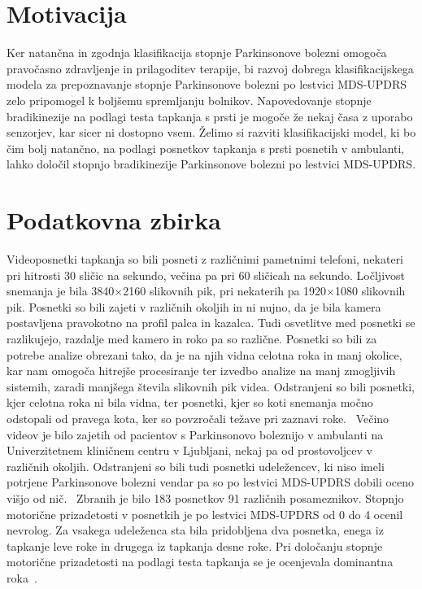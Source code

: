 \documentclass[a4paper,12pt]{article}
\begin{document}
\section{Motivacija}

Ker natančna in zgodnja klasifikacija stopnje Parkinsonove bolezni omogoča pravočasno zdravljenje in 
prilagoditev terapije, bi razvoj dobrega klasifikacijskega modela za prepoznavanje stopnje Parkinsonove 
bolezni po lestvici MDS-UPDRS zelo pripomogel k boljšemu spremljanju bolnikov. Napovedovanje stopnje 
bradikinezije na podlagi testa tapkanja s prsti je mogoče že nekaj časa z uporabo senzorjev, kar sicer ni 
dostopno vsem. Želimo si razviti klasifikacijski model, ki bo čim bolj natančno, na podlagi posnetkov tapkanja 
s prsti posnetih v ambulanti, lahko določil stopnjo bradikinezije Parkinsonove bolezni po lestvici MDS-UPDRS.

\section{Podatkovna zbirka}

Videoposnetki tapkanja so bili posneti z različnimi pametnimi telefoni, nekateri pri hitrosti 30 sličic na 
sekundo, večina pa pri 60 sličicah na sekundo. Ločljivost snemanja je bila 3840$\times$2160 slikovnih pik, pri 
nekaterih pa 1920$\times$1080 slikovnih pik. Posnetki so bili zajeti v različnih okoljih in ni nujno, da je bila 
kamera postavljena pravokotno na profil palca in kazalca. Tudi osvetlitve med posnetki se razlikujejo, razdalje 
med kamero in roko pa so različne. Posnetki so bili za potrebe analize obrezani tako, da je na njih vidna 
celotna roka in manj okolice, kar nam omogoča hitrejše procesiranje ter izvedbo analize na manj 
zmogljivih sistemih, zaradi manjšega števila slikovnih pik videa. Odstranjeni so bili posnetki, kjer 
celotna roka ni bila vidna, ter posnetki, kjer so koti snemanja močno odstopali od pravega kota, ker so 
povzročali težave pri zaznavi roke. \
Večino videov je bilo zajetih od pacientov s Parkinsonovo boleznijo v ambulanti na Univerzitetnem kliničnem 
centru v Ljubljani, nekaj pa od prostovoljcev v različnih okoljih. Odstranjeni so bili tudi posnetki udeležencev, ki 
niso imeli potrjene Parkinsonove bolezni vendar pa so po lestvici MDS-UPDRS dobili oceno višjo od nič. \
Zbranih je bilo 183 posnetkov 91 različnih posameznikov. Stopnjo motorične prizadetosti v posnetkih je po 
lestvici MDS-UPDRS od 0 do 4 ocenil nevrolog. Za vsakega udeleženca sta bila pridobljena dva posnetka, enega 
iz tapkanje leve roke in drugega iz tapkanja desne roke. Pri določanju stopnje motorične prizadetosti na 
podlagi testa tapkanja se je ocenjevala dominantna roka~\cite{Zupanic}. 
\end{document}
